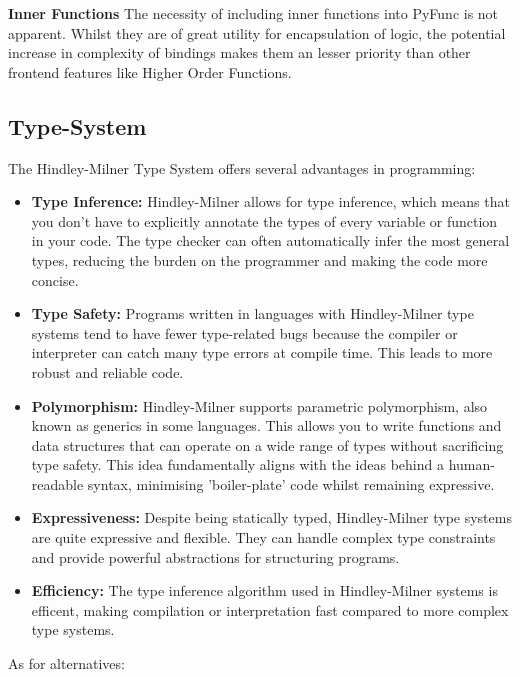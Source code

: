 \documentclass{l4proj}
\begin{document}
\textbf{Inner Functions}
The necessity of including inner functions into PyFunc is not apparent.
Whilst they are of great utility for encapsulation of logic, the potential increase in complexity of bindings makes them an lesser priority than other frontend features like Higher Order Functions.

\subsection{Type-System}
The Hindley-Milner Type System offers several advantages in programming:

\begin{itemize}
    \item \textbf{Type Inference:} Hindley-Milner allows for type inference, which means that you don't have to explicitly annotate the types of every variable or function in your code.
    The type checker can often automatically infer the most general types, reducing the burden on the programmer and making the code more concise.
    \item \textbf{Type Safety:} Programs written in languages with Hindley-Milner type systems tend to have fewer type-related bugs because the compiler or interpreter can catch many type errors at compile time.
    This leads to more robust and reliable code.
    \item \textbf{Polymorphism:} Hindley-Milner supports parametric polymorphism, also known as generics in some languages.
    This allows you to write functions and data structures that can operate on a wide range of types without sacrificing type safety.
    This idea fundamentally aligns with the ideas behind a human-readable syntax, minimising 'boiler-plate' code whilst remaining expressive.
    \item \textbf{Expressiveness:} Despite being statically typed, Hindley-Milner type systems are quite expressive and flexible.
    They can handle complex type constraints and provide powerful abstractions for structuring programs.
    \item \textbf{Efficiency:} The type inference algorithm used in Hindley-Milner systems is efficent, making compilation or interpretation fast compared to more complex type systems.
\end{itemize}

As for alternatives:
\end{document}
